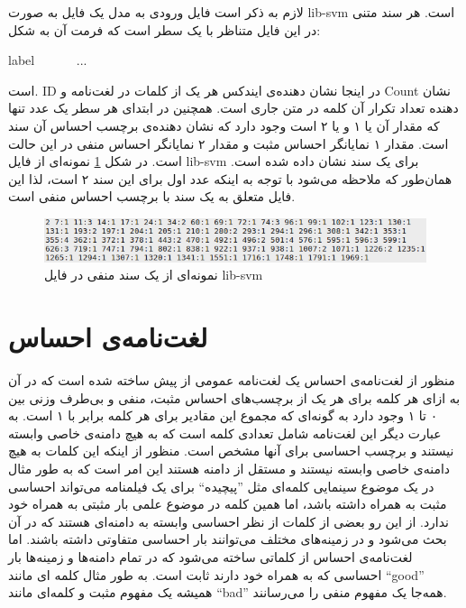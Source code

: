 لازم به ذکر است فایل ورودی به مدل یک فایل به صورت 
lib-svm
است. هر سند متنی در این فایل متناظر با یک سطر است که فرمت آن به شکل:
\begin{latin}
	label \ <ID:Count> \ <ID:Count> \ <ID:Count> \ ... 
\end{latin} 
است.
ID
در اینجا نشان دهنده‌ی ایندکس هر یک از کلمات در لغت‌نامه و
Count
نشان دهنده تعداد تکرار آن کلمه در متن جاری است. همچنین در ابتدای هر سطر یک عدد تنها که مقدار آن یا ۱ و یا ۲ است وجود دارد که نشان دهند‌ه‌ی برچسب احساس آن سند است. مقدار ۱ نمایانگر احساس مثبت و مقدار ۲ نمایانگر احساس منفی‌ در این حالت است. در شکل 
\ref{chap5-fig1}
نمونه‌ای از فایل 
lib-svm
برای یک سند نشان داده شده است. همان‌طور که ملاحظه می‌شود با توجه به اینکه عدد اول برای این سند ۲ است، لذا این فایل متعلق به یک سند با برچسب احساس منفی است.
\begin{figure}[!t]
	\centering
	\includegraphics[scale=0.7]{chap5-img/libsvm-example}
	\caption{نمونه‌ای از یک سند منفی در فایل lib-svm}
	\label{chap5-fig1}
\end{figure}


\section{لغت‌نامه‌ی احساس}
\label{chap5sec5}
منظور از لغت‌نامه‌ی احساس یک لغت‌نامه عمومی‌ از پیش ساخته شده است که در آن به ازای هر کلمه برای هر یک از برچسب‌های احساس مثبت، منفی‌ و بی‌طرف وزنی بین ۰ تا ۱ وجود دارد به گونه‌ای که مجموع این مقادیر برای هر کلمه برابر با ۱ است. به عبارت دیگر این لغت‌نامه شامل تعدادی کلمه است که به هیچ دامنه‌ی خاصی‌ وابسته نیستند و برچسب احساسی‌ برای آنها مشخص است. منظور از اینکه این کلمات به هیچ دامنه‌ی خاصی‌ وابسته نیستند و مستقل از دامنه هستند این امر است که به طور مثال در یک موضوع سینمایی کلمه‌ای مثل ''پیچیده`` برای یک فیلمنامه می‌‌تواند احساسی‌ مثبت به همراه داشته باشد، اما همین کلمه در موضوع علمی‌ بار مثبتی به همراه خود ندارد. از این رو بعضی‌ از کلمات از نظر احساسی‌ وابسته به دامنه‌ای هستند که در آن بحث می‌‌شود و در زمینه‌های مختلف می‌‌توانند بار احساسی‌ متفاوتی داشته باشند. اما لغت‌نامه‌ی احساس از کلماتی ساخته می‌‌شود که در تمام دامنه‌‌ها و زمینه‌ها بار احساسی‌ که به همراه خود دارند ثابت است. به طور مثال کلمه ای‌ مانند
``good''
همیشه یک مفهوم مثبت و کلمه‌ای مانند
``bad'' 
 همه‌‌جا یک مفهوم منفی‌ را می‌‌رسانند.

